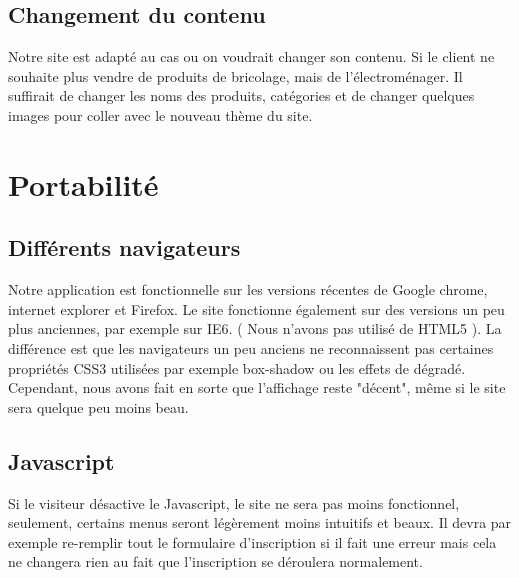 \subsection{Changement du contenu}
	Notre site est adapté au cas ou on voudrait changer son contenu. Si le client ne souhaite plus vendre de produits de bricolage, mais de l'électroménager.
Il suffirait de changer les noms des produits, catégories et de changer quelques images pour coller avec le nouveau thème du site.	

	\section{Portabilité}

\subsection{Différents navigateurs}

	Notre application est fonctionnelle sur les versions récentes de Google chrome, internet explorer et Firefox. Le site fonctionne également sur des versions un peu plus anciennes, par exemple sur IE6. ( Nous n'avons pas utilisé de HTML5 ). La différence est que les navigateurs un peu anciens ne reconnaissent pas certaines propriétés CSS3 utilisées par exemple box-shadow ou les effets de dégradé. Cependant, nous avons fait en sorte que l'affichage reste "décent", même si le site sera quelque peu moins beau.

\subsection{Javascript}

	Si le visiteur désactive le Javascript, le site ne sera pas moins fonctionnel, seulement, certains menus seront légèrement moins intuitifs et beaux. Il devra par exemple re-remplir tout le formulaire d'inscription si il fait une erreur mais cela ne changera rien au fait que l'inscription se déroulera normalement.